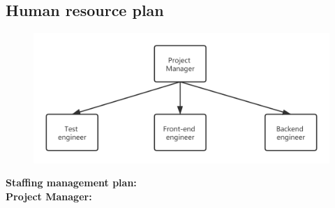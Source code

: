 \documentclass[runningheads]{llncs}
\begin{document}
\subsection{Human resource plan}
\begin{figure}[H]
\centering
\includegraphics[width=4.5in]{1.png}
\end{figure}
\textbf{Staffing management plan:}\\
\textbf{Project Manager:}
\end{document}
